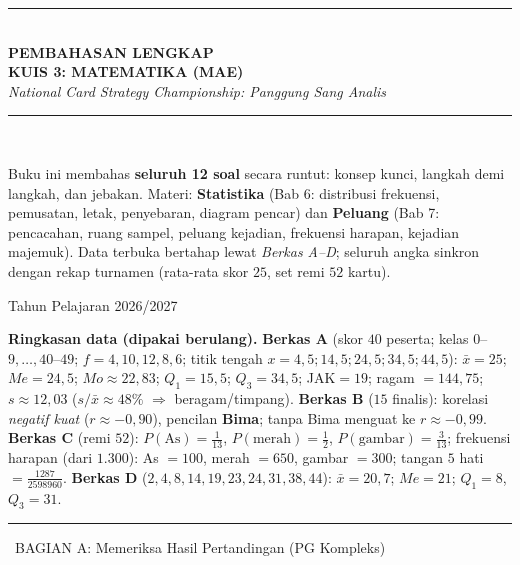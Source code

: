 \documentclass[11pt,a4paper]{article}
\newcommand{\bagianjudul}[1]{\par\bigskip\noindent%
  {\large\bfseries\color{ungu}\rule[-2pt]{4pt}{16pt}\ #1}\par\smallskip}
\begin{document}
\thispagestyle{empty}
\begin{center}
\vspace*{1.5cm}
{\color{ungu}\rule{\textwidth}{2pt}}\\[0.5cm]
{\Huge\bfseries\color{ungu} PEMBAHASAN LENGKAP}\\[0.3cm]
{\LARGE\bfseries KUIS 3: MATEMATIKA (MAE)}\\[0.4cm]
{\large\itshape National Card Strategy Championship: Panggung Sang Analis}\\[0.3cm]
{\color{ungu}\rule{\textwidth}{2pt}}\\[1cm]

\begin{tcolorbox}[enhanced,width=0.9\textwidth,colback=ungumuda,colframe=ungu,arc=4pt,boxrule=1pt]
\centering\small
Buku ini membahas \textbf{seluruh 12 soal} secara runtut: konsep kunci, langkah
demi langkah, dan jebakan. Materi: \textbf{Statistika} (Bab 6: distribusi
frekuensi, pemusatan, letak, penyebaran, diagram pencar) dan \textbf{Peluang}
(Bab 7: pencacahan, ruang sampel, peluang kejadian, frekuensi harapan, kejadian
majemuk). Data terbuka bertahap lewat \emph{Berkas A--D}; seluruh angka sinkron
dengan rekap turnamen (rata-rata skor $25$, set remi $52$ kartu).
\end{tcolorbox}

\vfill
{\large Tahun Pelajaran 2026/2027}
\end{center}
\clearpage

\begin{tips}
\textbf{Ringkasan data (dipakai berulang).}
\textbf{Berkas A} (skor $40$ peserta; kelas $0$--$9,\dots,40$--$49$; $f=4,10,12,8,6$;
titik tengah $x=4{,}5;14{,}5;24{,}5;34{,}5;44{,}5$): $\bar{x}=25$; $Me=24{,}5$;
$Mo\approx22{,}83$; $Q_1=15{,}5$; $Q_3=34{,}5$; JAK$=19$; ragam $=144{,}75$;
$s\approx12{,}03$ ($s/\bar{x}\approx48\%$ $\Rightarrow$ beragam/timpang).
\textbf{Berkas B} ($15$ finalis):
korelasi \emph{negatif kuat} ($r\approx-0{,}90$), pencilan \textbf{Bima}; tanpa
Bima menguat ke $r\approx-0{,}99$. \textbf{Berkas C} (remi $52$):
$P(\mathrm{As})=\tfrac{1}{13}$, $P(\text{merah})=\tfrac12$,
$P(\text{gambar})=\tfrac{3}{13}$; frekuensi harapan (dari $1.300$): As $=100$,
merah $=650$, gambar $=300$; tangan $5$ hati $=\tfrac{1287}{2598960}$.
\textbf{Berkas D} ($2,4,8,14,19,23,24,31,38,44$): $\bar{x}=20{,}7$; $Me=21$;
$Q_1=8$, $Q_3=31$.
\end{tips}

\bagianjudul{BAGIAN A: Memeriksa Hasil Pertandingan (PG Kompleks)}
\end{document}
